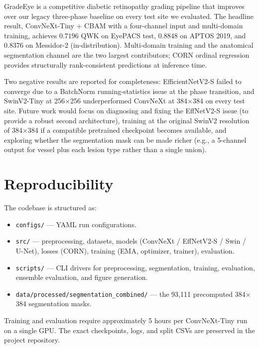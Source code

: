 \documentclass[11pt,a4paper]{article}
\begin{document}
GradeEye is a competitive diabetic retinopathy grading pipeline that improves over our legacy three-phase baseline on every test site we evaluated. The headline result, ConvNeXt-Tiny + CBAM with a four-channel input and multi-domain training, achieves $0.7196$ QWK on EyePACS test, $0.8848$ on APTOS 2019, and $0.8376$ on Messidor-2 (in-distribution). Multi-domain training and the anatomical segmentation channel are the two largest contributors; CORN ordinal regression provides structurally rank-consistent predictions at inference time.

Two negative results are reported for completeness: EfficientNetV2-S failed to converge due to a BatchNorm running-statistics issue at the phase transition, and SwinV2-Tiny at 256$\times$256 underperformed ConvNeXt at 384$\times$384 on every test site. Future work would focus on diagnosing and fixing the EffNetV2-S issue (to provide a robust second architecture), training at the original SwinV2 resolution of 384$\times$384 if a compatible pretrained checkpoint becomes available, and exploring whether the segmentation mask can be made richer (e.g., a 5-channel output for vessel plus each lesion type rather than a single union).

\section*{Reproducibility}

The codebase is structured as:
\begin{itemize}
  \item \texttt{configs/} --- YAML run configurations.
  \item \texttt{src/} --- preprocessing, datasets, models (ConvNeXt / EffNetV2-S / Swin / U-Net), losses (CORN), training (EMA, optimizer, trainer), evaluation.
  \item \texttt{scripts/} --- CLI drivers for preprocessing, segmentation, training, evaluation, ensemble evaluation, and figure generation.
  \item \texttt{data/processed/segmentation\_combined/} --- the 93{,}111 precomputed 384$\times$384 segmentation masks.
\end{itemize}

Training and evaluation require approximately 5 hours per ConvNeXt-Tiny run on a single GPU. The exact checkpoints, logs, and split CSVs are preserved in the project repository.
\end{document}
